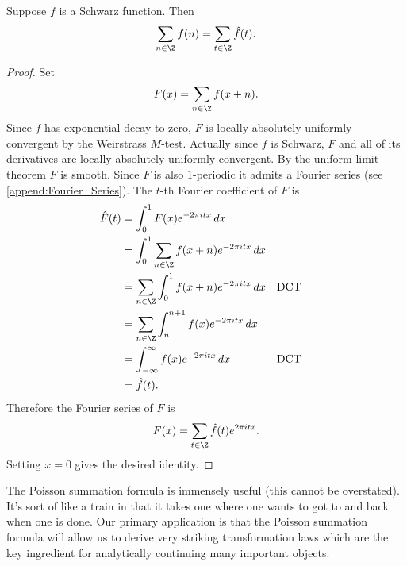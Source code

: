        \begin{theorem}
          Suppose $f$ is a Schwarz function. Then
          \[
            \sum_{n \in \Z}f(n) = \sum_{t \in \Z}\hat{f}(t).
          \]
        \end{theorem}
        \begin{proof}
          Set
          \[
            F(x) = \sum_{n \in \Z}f(x+n).
          \]
          Since $f$ has exponential decay to zero, $F$ is locally absolutely uniformly convergent by the Weirstrass $M$-test. Actually since $f$ is Schwarz, $F$ and all of its derivatives are locally absolutely uniformly convergent. By the uniform limit theorem $F$ is smooth. Since $F$ is also $1$-periodic it admits a Fourier series (see \cref{append:Fourier_Series}). The $t$-th Fourier coefficient of $F$ is
          \begin{align*}
            \hat{F}(t) &= \int_{0}^{1}F(x)e^{-2\pi itx}\,dx \\
            &= \int_{0}^{1}\sum_{n \in \Z}f(x+n)e^{-2\pi itx}\,dx \\
            &= \sum_{n \in \Z}\int_{0}^{1}f(x+n)e^{-2\pi itx}\,dx && \text{DCT} \\
            &= \sum_{n \in \Z}\int_{n}^{n+1}f(x)e^{-2\pi itx}\,dx \\
            &= \int_{-\infty}^{\infty}f(x)e^{-2\pi itx}\,dx && \text{DCT} \\
            &= \hat{f}(t).
          \end{align*}
          Therefore the Fourier series of $F$ is
          \[
            F(x) = \sum_{t \in \Z}\hat{f}(t)e^{2\pi itx}.
          \]
          Setting $x = 0$ gives the desired identity.
        \end{proof}

        The Poisson summation formula is immensely useful (this cannot be overstated). It's sort of like a train in that it takes one where one wants to got to and back when one is done. Our primary application is that the Poisson summation formula will allow us to derive very striking transformation laws which are the key ingredient for analytically continuing many important objects.
